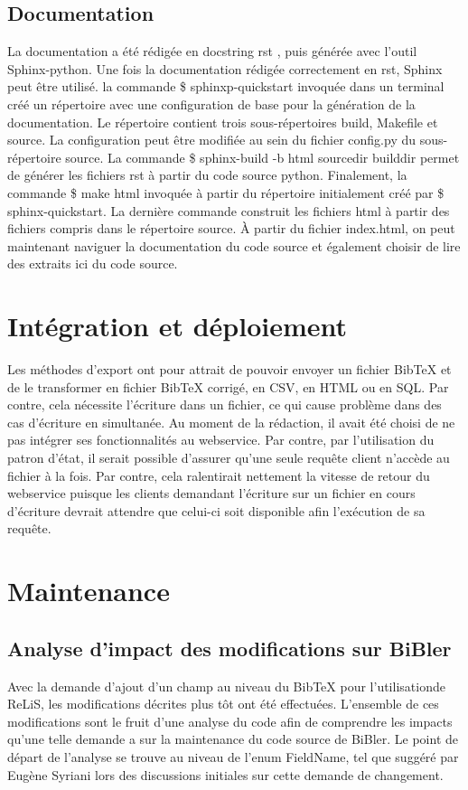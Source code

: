 \documentclass[12pt,titlepage]{article}
\let\oldsection\section
\renewcommand\section{\clearpage\oldsection}
\begin{document}
\subsection{Documentation}
La documentation a été rédigée en docstring rst \cite{PDGa}, puis générée avec l'outil Sphinx-python. Une fois la documentation rédigée correctement en rst, Sphinx peut être utilisé. la commande \$ sphinxp-quickstart invoquée dans un terminal créé un répertoire avec une configuration de base pour la génération de la documentation. Le répertoire contient trois sous-répertoires build, Makefile et source. La configuration peut être modifiée au sein du fichier config.py du sous-répertoire source. La commande \$ sphinx-build -b html sourcedir builddir permet de générer les fichiers rst à partir du code source python. Finalement, la commande \$ make html invoquée à partir du répertoire initialement créé par \$ sphinx-quickstart. La dernière commande construit les fichiers html à partir des fichiers compris dans le répertoire source. À partir du fichier index.html, on peut maintenant naviguer la documentation du code source et également choisir de lire des extraits ici du code source. 

\section{Intégration et déploiement}


Les méthodes d'export ont pour attrait de pouvoir envoyer un fichier BibTeX et de le transformer en fichier BibTeX corrigé, en CSV, en HTML ou en SQL. Par contre, cela nécessite l'écriture dans un fichier, ce qui cause problème dans des cas d'écriture en simultanée. Au moment de la rédaction, il avait été choisi de ne pas intégrer ses fonctionnalités au webservice. Par contre, par l'utilisation du patron d'état, il serait possible d'assurer qu'une seule requête client n'accède au fichier à la fois. Par contre, cela ralentirait nettement la vitesse de retour du webservice puisque les clients demandant l'écriture sur un fichier en cours d'écriture devrait attendre que celui-ci soit disponible afin l'exécution de sa requête.\newline



\section{Maintenance}
\subsection{Analyse d'impact des modifications sur BiBler}
Avec la demande d'ajout d'un champ au niveau du BibTeX pour l'utilisationde ReLiS, les modifications décrites plus tôt ont été effectuées. L'ensemble de ces modifications sont le fruit d'une analyse du code afin de comprendre les impacts qu'une telle demande a sur la maintenance du code source de BiBler. Le point de départ de l'analyse se trouve au niveau de l'enum FieldName, tel que suggéré par Eugène Syriani lors des discussions initiales sur cette demande de changement. \newline
\end{document}
